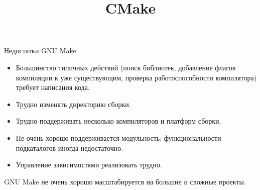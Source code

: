 \documentclass[compress, 8pt, aspectratio=169]{beamer}
\title{CMake}
\begin{document}
\begin{frame}
  \titlepage
\end{frame}

\begin{frame}{Недостатки GNU Make}

  \begin{itemize}

    \item Большинство типичных действий (поиск библиотек, добавление
      флагов компиляции к уже существующим, проверка работоспособности
      компилятора) требует написания кода.

    \item Трудно изменять директорию сборки.

    \item Трудно поддерживать несколько компиляторов и платформ сборки.

    \item Не очень хорошо поддерживается модульность: функциональности
      подкаталогов иногда недостаточно.

    \item Управление зависимостями реализовать трудно.

  \end{itemize}

  \bigbreak

  GNU Make не очень хорошо масштабируется на большие и сложные проекты.

\end{frame}
\end{document}
